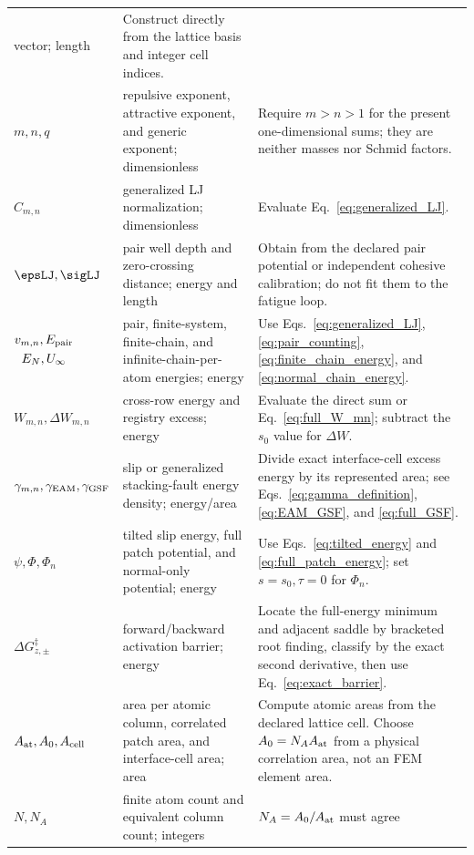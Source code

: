 \begin{longtable}{>{\raggedright\arraybackslash}p{}
                  >{\raggedright\arraybackslash}p{}
                  >{\raggedright\arraybackslash}p{}}
vector; length & Construct directly from the lattice basis and integer cell indices.\\
$m,n,q$ & repulsive exponent, attractive exponent, and generic exponent; dimensionless & Require
$m>n>1$ for the present one-dimensional sums; they are neither masses nor Schmid factors.\\
$C_{m,n}$ & generalized LJ normalization; dimensionless & Evaluate
Eq.~\eqref{eq:generalized_LJ}.\\
$\epsLJ,\sigLJ$ & pair well depth and zero-crossing distance; energy and length & Obtain from the
declared pair potential or independent cohesive calibration; do not fit them to the fatigue loop.\\
$\begin{gathered}v_{m,n},E_{\rm pair}\\E_N,U_\infty\end{gathered}$ & pair, finite-system, finite-chain, and infinite-chain-per-atom
energies; energy & Use Eqs.~\eqref{eq:generalized_LJ}, \eqref{eq:pair_counting},
\eqref{eq:finite_chain_energy}, and \eqref{eq:normal_chain_energy}.\\
$W_{m,n},\Delta W_{m,n}$ & cross-row energy and registry excess; energy & Evaluate the direct sum or
Eq.~\eqref{eq:full_W_mn}; subtract the $s_0$ value for $\Delta W$.\\
$\gamma_{m,n},\gamma_{\rm EAM},\gamma_{\rm GSF}$ & slip or generalized stacking-fault energy
density; energy/area & Divide exact interface-cell excess energy by its represented area; see
Eqs.~\eqref{eq:gamma_definition}, \eqref{eq:EAM_GSF}, and \eqref{eq:full_GSF}.\\
$\psi,\Phi,\Phi_n$ & tilted slip energy, full patch potential, and normal-only potential; energy &
Use Eqs.~\eqref{eq:tilted_energy} and \eqref{eq:full_patch_energy}; set $s=s_0,\tau=0$ for
$\Phi_n$.\\
$\Delta G_{z,\pm}^\ddagger$ & forward/backward activation barrier; energy & Locate the full-energy
minimum and adjacent saddle by bracketed root finding, classify by the exact second derivative,
then use Eq.~\eqref{eq:exact_barrier}.\\
$A_{\rm at},A_0,A_{\rm cell}$ & area per atomic column, correlated patch area, and interface-cell
area; area & Compute atomic areas from the declared lattice cell. Choose $A_0=N_AA_{\rm at}$ from
a physical correlation area, not an FEM element area.\\
$N,N_A$ & finite atom count and equivalent column count; integers & $N_A=A_0/A_{\rm at}$ must agree

\end{longtable}
